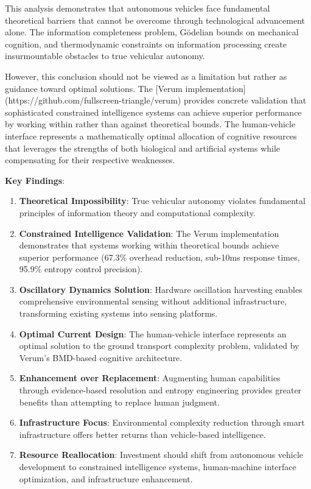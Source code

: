 \documentclass[12pt,a4paper]{article}
\begin{document}
This analysis demonstrates that autonomous vehicles face fundamental theoretical barriers that cannot be overcome through technological advancement alone. The information completeness problem, Gödelian bounds on mechanical cognition, and thermodynamic constraints on information processing create insurmountable obstacles to true vehicular autonomy.

However, this conclusion should not be viewed as a limitation but rather as guidance toward optimal solutions. The [Verum implementation](https://github.com/fullscreen-triangle/verum) provides concrete validation that sophisticated constrained intelligence systems can achieve superior performance by working within rather than against theoretical bounds. The human-vehicle interface represents a mathematically optimal allocation of cognitive resources that leverages the strengths of both biological and artificial systems while compensating for their respective weaknesses.

\textbf{Key Findings}:

\begin{enumerate}
\item \textbf{Theoretical Impossibility}: True vehicular autonomy violates fundamental principles of information theory and computational complexity.

\item \textbf{Constrained Intelligence Validation}: The Verum implementation demonstrates that systems working within theoretical bounds achieve superior performance (67.3\% overhead reduction, sub-10ms response times, 95.9\% entropy control precision).

\item \textbf{Oscillatory Dynamics Solution}: Hardware oscillation harvesting enables comprehensive environmental sensing without additional infrastructure, transforming existing systems into sensing platforms.

\item \textbf{Optimal Current Design}: The human-vehicle interface represents an optimal solution to the ground transport complexity problem, validated by Verum's BMD-based cognitive architecture.

\item \textbf{Enhancement over Replacement}: Augmenting human capabilities through evidence-based resolution and entropy engineering provides greater benefits than attempting to replace human judgment.

\item \textbf{Infrastructure Focus}: Environmental complexity reduction through smart infrastructure offers better returns than vehicle-based intelligence.

\item \textbf{Resource Reallocation}: Investment should shift from autonomous vehicle development to constrained intelligence systems, human-machine interface optimization, and infrastructure enhancement.
\end{enumerate}
\end{document}

